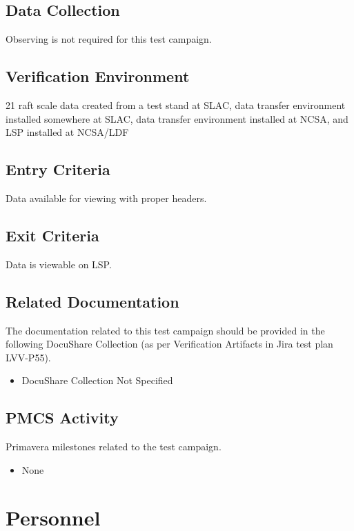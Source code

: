 \documentclass[DM,lsstdraft,STR,toc]{lsstdoc}
\begin{document}
\subsection{Data Collection}

  Observing is not required for this test campaign.

\subsection{Verification Environment}
\label{sect:hwconf}
  21 raft scale data created from a test stand at SLAC, data transfer
environment installed somewhere at SLAC, data transfer environment
installed at NCSA, and LSP installed at NCSA/LDF~

  \subsection{Entry Criteria}
  Data available for viewing with proper headers.~~

  \subsection{Exit Criteria}
  Data is viewable on LSP.~~


\subsection{Related Documentation}

The documentation related to this test campaign should be provided in the following DocuShare Collection
(as per Verification Artifacts in Jira test plan LVV-P55).

\begin{itemize}
\item DocuShare Collection Not Specified
\end{itemize}



\subsection{PMCS Activity}

Primavera milestones related to the test campaign.

\begin{itemize}
\item None
\end{itemize}


\newpage
\section{Personnel}
\label{sect:personnel}
\end{document}
